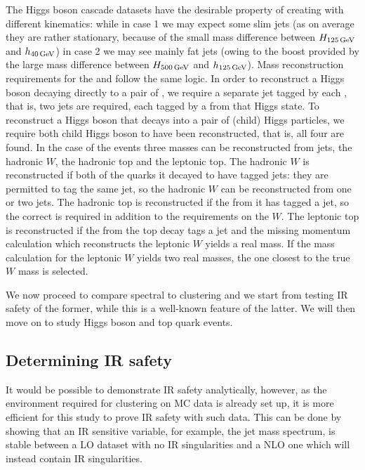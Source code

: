     The Higgs boson cascade datasets have the desirable property of creating  with different kinematics: while in case 1 we may expect some slim  jets (as on average they are rather stationary, because of the small mass difference between $H_{125\,{\rm GeV}}$ and $h_{40\,{\rm GeV}}$)
in case 2 we may see mainly fat jets (owing to the boost provided by the large mass difference between $H_{500\,{\rm GeV}}$ and $h_{125\,{\rm GeV}}$).
Mass reconstruction requirements for the  and  follow the same logic.
In order to reconstruct a Higgs boson decaying directly to a pair of , we require a separate jet tagged by each , that is, two jets are required, each tagged by a  from that Higgs state.
To reconstruct a Higgs boson that decays into a pair of (child) Higgs particles,
we require both child Higgs boson to have been reconstructed,
that is, all four  are found.
In the case of the  events
three masses can be reconstructed from jets, the hadronic \(W\),
the hadronic top and the leptonic top.
The hadronic \(W\) is reconstructed if both of the quarks it decayed to have tagged jets: they are permitted to tag the same jet, so the hadronic \(W\) can be reconstructed from one or two jets.
The hadronic top is reconstructed if the  from it has tagged a jet, so the correct  is required in addition to the requirements on the \(W\).
The leptonic top is reconstructed if the  from the top decay tags a jet and the missing momentum calculation which reconstructs the leptonic \(W\) yields a real mass.
If the mass calculation for  the leptonic \(W\) yields two real masses, the one closest to the true \(W\) mass is selected.

We now proceed to compare spectral to \antikt{} clustering and we start from testing IR safety of the former, while this is a well-known feature of the latter.
We will then move on to study Higgs boson and top quark events.


\subsection{Determining IR safety}\label{sec:IRmethod}
    It would be possible to demonstrate IR safety analytically, however,
    as the environment required for clustering on MC data is already set up,
    it is more efficient for this study to prove IR safety with such data.
    This can be done by showing that an IR sensitive variable, for example, the jet mass spectrum,
    is stable between a LO dataset with no IR singularities and a NLO
    one which will instead contain IR singularities.

